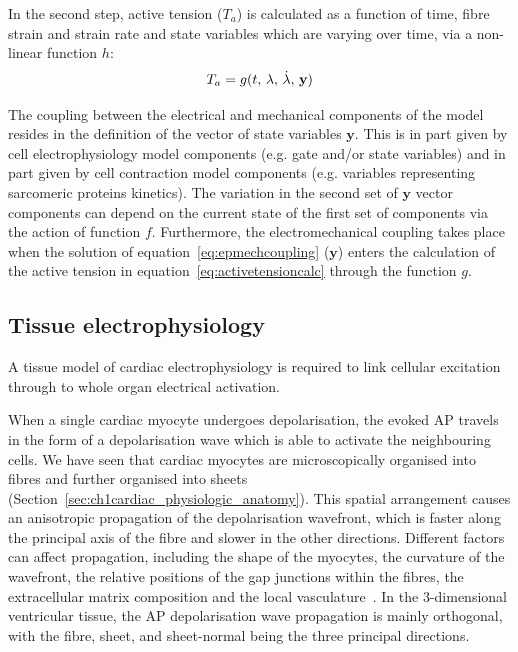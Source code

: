 \vspace{0.2cm}\noindent
In the second step, active tension ($T_a$) is calculated as a function of time, fibre strain and strain rate and state variables which are varying over time, via a non-linear function $h$:
%
\begin{equation}\label{eq:activetensioncalc}
    T_a = g(t,\, \lambda,\,\dot{\lambda},\,\mathbf{y}) \\
\end{equation}

\vspace{0.2cm}
The coupling between the electrical and mechanical components of the model resides in the definition of the vector of state variables $\mathbf{y}$. This is in part given by cell electrophysiology model components (e.g. gate and/or state variables) and in part given by cell contraction model components (e.g. variables representing sarcomeric proteins kinetics). The variation in the second set of $\mathbf{y}$ vector components can depend on the current state of the first set of components via the action of function $f$. Furthermore, the electromechanical coupling takes place when the solution of equation~\eqref{eq:epmechcoupling} ($\mathbf{y}$) enters the calculation of the active tension in equation~\eqref{eq:activetensioncalc} through the function $g$.


%
%
%
\subsection{Tissue electrophysiology}\label{sec:tissue_ep_math_modelling}
A tissue model of cardiac electrophysiology is required to link cellular excitation through to whole organ electrical activation.

\vspace{0.2cm}
When a single cardiac myocyte undergoes depolarisation, the evoked AP travels in the form of a depolarisation wave which is able to activate the neighbouring cells. We have seen that cardiac myocytes are microscopically organised into fibres and further organised into sheets (Section~\ref{sec:ch1cardiac_physiologic_anatomy}). This spatial arrangement causes an anisotropic propagation of the depolarisation wavefront, which is faster along the principal axis of the fibre and slower in the other directions. Different factors can affect propagation, including the shape of the myocytes, the curvature of the wavefront, the relative positions of the gap junctions within the fibres, the extracellular matrix composition and the local vasculature~\cite{Clayton:2011}. In the $3$-dimensional ventricular tissue, the AP depolarisation wave propagation is mainly orthogonal, with the fibre, sheet, and sheet-normal being the three principal directions.

